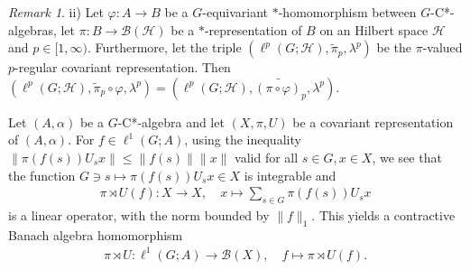 \documentclass[12pt]{amsart}
\theoremstyle{definition}
\theoremstyle{remark}
\newtheorem{rem}[thm]{Remark}
\numberwithin{equation}{section}
\begin{document}
\begin{rem}
	ii) Let $\varphi\colon A \to B$ be a $G$-equivariant $*$-homomorphism between
	$G$-C*-algebras, let $\pi\colon B \to \mathcal{B}(\mathcal{H})$ be a $*$-representation of $B$ on
	an Hilbert space $\mathcal{H}$ and $p\in [1,\infty)$. Furthermore,
	let the triple $(\ell^p(G;\mathcal{H}), \widetilde{\pi}_p, \lambda^p)$ be the 
	$\pi$-valued $p$-regular covariant representation. Then
	$(\ell^p(G;\mathcal{H}),\widetilde{\pi}_p\circ \varphi, \lambda^p) =
	(\ell^p(G;\mathcal{H}),\widetilde{(\pi\circ \varphi)_p}, \lambda^p)$.
\end{rem}

Let $(A,\alpha)$ be a $G$-C*-algebra and let $(X,\pi, U)$ be a covariant representation of $(A,\alpha)$. For $f\in \ell^1(G;A)$, using the inequality
$\|\pi(f(s)) U_s x \| \leq \|f(s)\| \|x\|$ valid for all $s\in G,x\in X$, we see that the function
$G \ni s \mapsto \pi(f(s))U_s x \in X$ is integrable and
\begin{align*}
	\pi \rtimes U(f) \colon X \to X,\quad x \mapsto \sum_{s\in G} \pi(f(s))U_s x
\end{align*}
is a linear operator, with the norm bounded by $\|f\|_1$. This yields a contractive Banach algebra homomorphism
\begin{align*}
	\pi\rtimes U \colon \ell^1(G;A) \to \mathcal{B}(X),\quad  f \mapsto \pi\rtimes U(f).
\end{align*}
\end{document}
